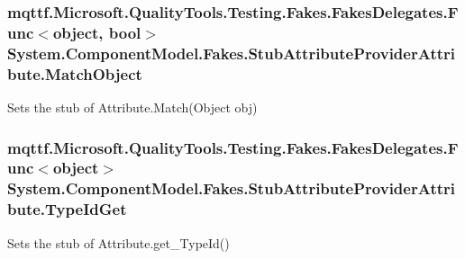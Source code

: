 \hypertarget{class_system_1_1_component_model_1_1_fakes_1_1_stub_attribute_provider_attribute_a3247228b7bef28f6e3c45e245b68fca7}{
\subsubsection[{Match\-Object}]{\setlength{\rightskip}{0pt plus 5cm}mqttf.\-Microsoft.\-Quality\-Tools.\-Testing.\-Fakes.\-Fakes\-Delegates.\-Func$<$object, bool$>$ System.\-Component\-Model.\-Fakes.\-Stub\-Attribute\-Provider\-Attribute.\-Match\-Object}}\label{class_system_1_1_component_model_1_1_fakes_1_1_stub_attribute_provider_attribute_a3247228b7bef28f6e3c45e245b68fca7}


Sets the stub of Attribute.\-Match(\-Object obj)

\hypertarget{class_system_1_1_component_model_1_1_fakes_1_1_stub_attribute_provider_attribute_a6496734fd608affbcf8064e7ba2abcc1}{
\subsubsection[{Type\-Id\-Get}]{\setlength{\rightskip}{0pt plus 5cm}mqttf.\-Microsoft.\-Quality\-Tools.\-Testing.\-Fakes.\-Fakes\-Delegates.\-Func$<$object$>$ System.\-Component\-Model.\-Fakes.\-Stub\-Attribute\-Provider\-Attribute.\-Type\-Id\-Get}}\label{class_system_1_1_component_model_1_1_fakes_1_1_stub_attribute_provider_attribute_a6496734fd608affbcf8064e7ba2abcc1}


Sets the stub of Attribute.\-get\-\_\-\-Type\-Id()



